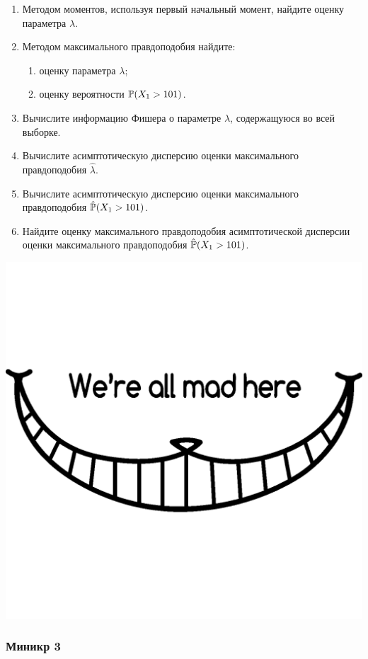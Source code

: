 \begin{enumerate}
\item Методом моментов, используя первый начальный момент, найдите оценку параметра $\lambda$.
\item Методом максимального правдоподобия найдите:
\begin{enumerate}
\item оценку параметра $\lambda$;
\item оценку вероятности $\P(X_1 > 101)$.
\end{enumerate}
\item Вычислите информацию Фишера о параметре $\lambda$, содержащуюся во всей выборке.
\item Вычислите асимптотическую дисперсию оценки максимального правдоподобия $\hat\lambda$.
\item Вычислите асимптотическую дисперсию оценки максимального правдоподобия $\hat\P(X_1 > 101)$.
\item Найдите оценку максимального правдоподобия асимптотической дисперсии оценки максимального правдоподобия  
$\hat\P(X_1 > 101)$.
\end{enumerate}
\begin{center}
\begin{minipage}{3cm}
  \includegraphics[height=20ex]{images/cheshire_cat.png}
\end{minipage}
\end{center}



\subsubsection*{Миникр 3}

